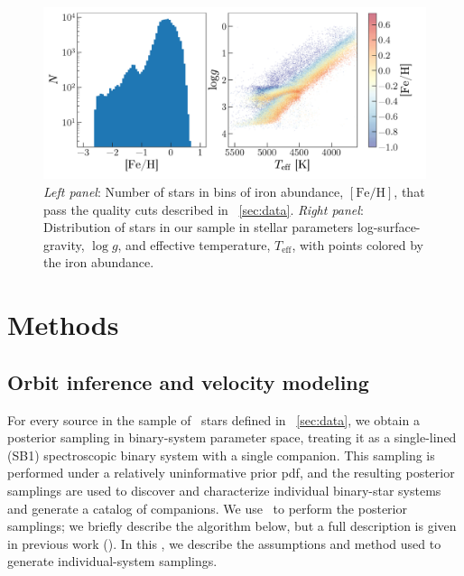 \documentclass[modern, letterpaper]{aastex62}
\newcommand{\apogee}{\project{\acronym{APOGEE}}}
\newcommand{\thejoker}{\project{The~Joker}}
\begin{document}
\begin{figure}[h]
\begin{center}
\includegraphics[width=\textwidth]{logg_teff_feh.pdf}
\end{center}
\caption{%
\textit{Left panel}: Number of stars in bins of iron abundance,
$[\textrm{Fe}/\textrm{H}]$, that pass the quality cuts described in
\sectionname~\ref{sec:data}.
\textit{Right panel}: Distribution of stars in our sample in stellar parameters
log-surface-gravity, $\log g$, and effective temperature, $T_{\textrm{eff}}$,
with points colored by the iron abundance.
\label{fig:loggteff}
}
\end{figure}


\section{Methods}

\subsection{Orbit inference and velocity modeling}\label{sec:fitting}

For every source in the sample of \apogee\ stars defined in
\sectionname~\ref{sec:data}, we obtain a posterior sampling in binary-system
parameter space, treating it as a single-lined (SB1) spectroscopic binary system
with a single companion.
This sampling is performed under a relatively uninformative prior pdf, and the
resulting posterior samplings are used to discover and characterize individual
binary-star systems and generate a catalog of companions.
We use \thejoker\ to perform the posterior samplings; we briefly describe the
algorithm below, but a full description is given in previous work
(\citealt{Price-Whelan:2017}).
In this \sectionname, we describe the assumptions and method used to generate
individual-system samplings.
\end{document}
